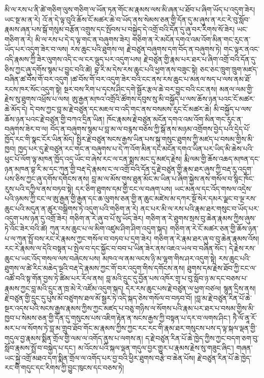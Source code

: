 \documentclass{article}
\begin{document}
མི་ལ་རས་པ་ནི་ཚེ་གཅིག་ལུས་གཅིག་ལ་ཡོན་ཏན་གོང་མ་རྣམས་ལས་མི་ཞན་པ་ཐོབ་པ་ཞིག་ཡོད་པ་འདུག་ཟེར། ཡང་སྔ་མ་ན་རེ། འོ་ན་དེ་ལྟ་བུའི་ཆོས་ངོ་མཚར་ཆེ་བ་ཡོད་ནས་སེམས་ཅན་གྱི་དོན་དུ་མ་ཞུས་ན་རང་རེ་བུ་སློབ་རྣམས་ཞན་པས་སྒོ་གསུམ་བརྩོན་འགྲུས་དང་སྤོབས་པ་བསྐྱེད་དེ་འགྲོ་བའི་དོན་དུ་ཞུ་བར་རིགས་སོ་ཟེར། ཡང་གཅིག་ན་རེ། མི་ལ་རས་པ་དེ་ད་ལྟ་གང་ན་བཞུགས་ཟེར། གཅིག་ན་རེ་མངོན་དགའ་འམ་འོག་མིན་གང་རུང་ན་ཡོད་པར་འདུག་ཟེར་བ་ལས། རས་ཆུང་པའི་ཐུགས་ལ། རྗེ་བཙུན་བཞུགས་དག་བོད་ན་བཞུགས་ཏེ། གང་ལྟར་ནའང་འདི་རྣམས་ཀྱི་ཟེར་ལུགས་འདི་ང་ལ་ངར་ལྡུད་པར་འདུག་པས། རྗེ་བཙུན་གྱི་རྣམ་པར་ཐར་པ་ཞིག་འགྲོ་བའི་དོན་དུ་ཅིས་ཀྱང་ཞུ་དགོས་སྙམ་པ་བྱུང་བའི་ཚེ། བྷ་རི་མ་དེས་རས་ཆུང་པའི་ཕྱག་ནས་བཟུང་སྟེ། ཅང་ཅང་ཁྲུག་ཁྲུག་མཛད་བཞིན་ཚ་བོས་གོ་བར་འདུག །ཚ་བོས་གོ་བར་འདུག་ཟེར་བའི་ངང་ནས་རས་ཆུང་པ་མནལ་སད་པ་ལས་ནམ་ཐོ་རངས་ཁར་སོང་འདུག་སྟེ། སྔར་བས་རིག་པ་དྭངས་ཤིང་དགེ་སྦྱོར་རྩལ་ཆེ་བར་བྱུང་བའི་ངང་ནས། མནལ་ལམ་གྱི་རྗེས་སུ་ཐུགས་འཕྲོས་པ་ལས། ཨུ་རྒྱན་མཁའ་འགྲོའི་ཚོགས་དབུས་སུ་མི་བསྐྱོད་པ་ལས་ཆོས་ཉན་པའང་ངོ་མཚར་ཆེ་མོད་དེ། དེ་བས་ཀྱང་བླ་མ་རྗེ་བཙུན་དང་མཇལ་བ་འདི་གང་ནས་བསམས་རུང་ངོ་མཚར་ཆེ། མི་བསྐྱོད་པ་ལས་ཆོས་ཉན་པའང་རྗེ་བཙུན་གྱི་བཀའ་དྲིན་ཡིན། ཁོང་རྣམས་རྗེ་བཙུན་མངོན་དགའ་འམ་འོག་མིན་གང་རུང་ན་བཞུགས་ཟེར་བ་ལ། བོད་ན་བཞུགས་སྙམ་པ་བླ་མ་ལ་བརྙས་བཅོས་ཀྱི་སྒོ་ནས་མཉམ་འགྲོགས་བྱེད་པའི་དྲེད་པོ་ཁྱོད་རང་གི་སྣང་ངོར་ཡིན་མོད། སྤྱིར་རྗེ་བཙུན་སངས་རྒྱས་ཡིན་པས་སྐུ་གསུང་ཐུགས་ཀྱི་མཛད་པ་བསམ་གྱིས་མི་ཁྱབ། ཁྱད་པར་དུ་རྗེ་བཙུན་རང་གང་ན་བཞུགས་པ་དེ་ཀ་འོག་མིན་དང་མངོན་དགའ་ཡིན་པར་ཡིད་མི་ཆེས་པའི་ཕུང་པོ་ལོག་ལྟ་མཁན་ཁྱོད་འདྲ་ཡོང་བ་ཞེས་རང་ལ་ངན་སྨྲས་མང་དུ་མཛད་རྗེས། རྨི་ལམ་གྱི་ཆོས་འཆད་མཁན་དང་ཉན་མཁན་བྷ་རི་མ་དང་ཀུན་གྱི་བརྡ་དེ་རྣམས་ང་ལ་འགྲོ་བའི་དོན་དུ་རྗེ་བཙུན་གྱི་རྣམ་ཐར་ཞུས་ཀྱི་བརྡ་རུ་འདུག་པས་ཅིས་ཀྱང་ཞུ་དགོས་དགོངས་ནས། བླ་མ་ལ་མོས་གུས་ཐུན་མོང་མ་ཡིན་པ་ཞིག་སྐྱེས་ནས་གསོལ་བ་སྙིང་ཁོང་རུས་པའི་དཀྱིལ་ནས་བཏབ་སྟེ། དར་ཅིག་ཐུགས་དམ་གྱི་ངང་ལ་བཞག་པས། ཡང་མནལ་དང་འོད་གསལ་འདྲེས་པའི་ཉམས་ཀྱི་ངང་ལ་ཨུ་རྒྱན་གྱི་རྒྱན་དང་ཆ་ལུགས་ཅན་གྱི་ན་ཆུང་མཛེས་མ་དཀར་སྔོ་སེར་དམར་ལྗང་བ་ལྔ་རས་ཆུང་པའི་མདུན་ན་ཚུར་བསྒྲིགས་ཏེ་འདུག་པའི་གཅིག་ན་རེ། ནང་པར་མི་ལ་རས་པའི་རྣམ་ཐར་གསུང་བ་ཡོད་པར་འདུག་པས་ཉན་དུ་འགྲོ་ཟེར། གཅིག་ན་རེ་ཞུ་བ་པོ་སུ་ཡོད་ཟེར། གཅིག་ན་རེ་ཐུགས་སྲས་བུ་ཆེན་རྣམས་ཀྱིས་ཞུས་ཏེ་འོང་ཟེར་བའི་ཚེ། ཀུན་རས་ཆུང་པ་ལ་མིག་འཛུམ་ཤིག་ཤིག་འདུག་སྐད། གཅིག་ན་རེ་ངོ་མཚར་ཅན་གྱི་ཆོས་ཉན་པ་ལ་ཀུན་སྤྲོ་བས་རང་རེ་རྣམས་ཀྱང་གསོལ་བ་བཏབ་པ་དྲག་ཟེར། གཅིག་ན་རེ་རྣམ་ཐར་ཞུ་བ་བུ་ཆེན་རྣམས་འོས། རང་རེ་རྣམས་ལ་དེའི་བསྟན་པ་སྤེལ་བ་དང་སྐྱོང་བ་བབ་པ་ཡིན་ཟེར་ནས་འཇའ་ཡལ་བ་བཞིན་སོང་། དེ་རྗེས་རས་ཆུང་པ་ཡང་འོད་གསལ་ལས་བཞེངས་པས། མཁའ་ལ་ནམ་ལངས་ཉི་མ་ལྷག་གིས་ཤར་འདུག་སྟེ། རས་ཆུང་པའི་ཐུགས་ལ་ཚེ་རིང་མཆེད་ལྔའི་བརྡ་དེ་རྣམས་ཀྱང་གོ་བར་འདུག་གིས་དགོངས་ནས། ཐུགས་དམ་རྗེས་ཐོབ་ཀྱི་ངང་ལ་འཚོ་བའི་སྟ་གོན་བྱས་ཏེ་ཚིམ་པར་རོལ་ནས། བླ་མའི་དྲུང་དུ་བྱོན་པས་འཁོར་གྲྭ་པ་བུ་སློབ་ཉ་མ་དང་བཅས་པ་རྣམས་ཀྱང་བླ་མའི་དྲུང་ན་ཁྲ་མེ་རེ་འཛོམ་འདུག་སྐད། དེར་རས་ཆུང་པས་རྗེ་བཙུན་ལ་ཕྱག་བཙལ། སྙུན་དྲིས་ནས། རྗེ་བཙུན་གྱི་དྲུང་དུ་པུས་མོ་བཙུགས་ཐལ་མོ་སྦྱར་ཏེ་འདི་སྐད་ཅེས་གསོལ་བ་བཏབ་བོ། །བླ་མ་རྗེ་བཙུན་རིན་པོ་ཆེ་སྔར་འདས་པའི་སངས་རྒྱས་རྣམས་ཀྱིས་ཀྱང་མཛད་པ་བཅུ་གཉིས་ལ་སོགས་པའི་རྣམ་པར་ཐར་པ་བསམ་གྱིས་མི་ཁྱབ་པ་སེམས་ཅན་གྱི་དོན་དུ་གསུངས་པས་འཇིག་རྟེན་ན་སངས་རྒྱས་ཀྱི་བསྟན་པ་དར་བ་ལགས་ཤིང་། ཏཻ་ལོ་ནཱ་རོ་མར་པ་ལ་སོགས་ཏེ་བླ་མ་གྲུབ་ཐོབ་གོང་མ་རྣམས་ཀྱིས་ཀྱང་རང་རང་གི་རྣམ་ཐར་གསུངས་པས་ད་ལྟ་སྐལ་ལྡན་གྱི་གདུལ་བྱ་རྣམས་སྨིན་གྲོལ་གྱི་ལམ་ལ་འགོད་ནུས་པ་ལགས་ན། ད་རྗེ་བཙུན་རིན་པོ་ཆེ་ཁྱེད་ཀྱིས་ཀྱང་བདག་ཅག་བུ་སློབ་རྣམས་སྤྲོ་བ་བསྐྱེད་པ་དང་། མ་འོངས་པའི་སྐལ་ལྡན་གདུལ་བྱར་གྱུར་པ་རྣམས་རྗེས་སུ་གཟུང་ཞིང་། གཞན་ཡང་སྐྱེ་འགྲོ་མཐའ་དག་སྨིན་གྲོལ་ལ་འགོད་པར་བྱ་བའི་ཕྱིར་ཐུགས་བརྩེ་བ་ཆེན་པོས། རྗེ་བཙུན་རིན་པོ་ཆེ་ཁྱེད་རང་གི་གདུང་དང་རིགས་ཀྱི་བྱུང་ཁུངས་དང་བཅས་ཏེ། 
\end{document}

